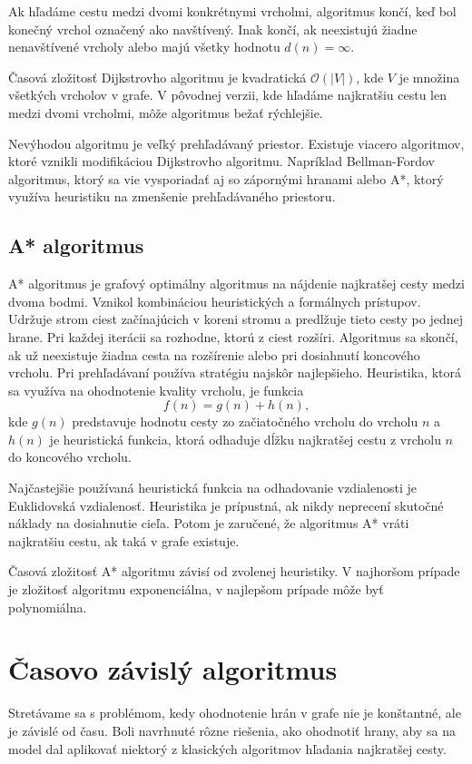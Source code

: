 Ak hľadáme cestu medzi dvomi konkrétnymi vrcholmi, algoritmus končí, keď bol konečný vrchol označený ako navštívený. Inak končí, ak neexistujú žiadne nenavštívené vrcholy alebo majú všetky hodnotu $d(n) = \infty$.

Časová zložitosť Dijkstrovho algoritmu je kvadratická
$\mathcal{O}(|V|)$, kde $V$ je množina všetkých vrcholov v grafe. V pôvodnej verzii, kde hľadáme najkratšiu cestu len medzi dvomi vrcholmi, môže algoritmus bežať rýchlejšie.

Nevýhodou algoritmu je veľký prehľadávaný priestor. Existuje viacero algoritmov, ktoré vznikli modifikáciou Dijkstrovho algoritmu. Napríklad Bellman-Fordov algoritmus, ktorý sa vie vysporiadať aj so zápornými hranami alebo A*, ktorý využíva heuristiku na zmenšenie prehľadávaného priestoru. 

\subsection{A* algoritmus}
\label{sec:a-star}
A* algoritmus je grafový optimálny algoritmus na nájdenie najkratšej cesty medzi dvoma bodmi. Vznikol kombináciou heuristických a formálnych prístupov. Udržuje strom ciest začínajúcich v koreni stromu a predlžuje tieto cesty po jednej hrane. Pri každej iterácii sa rozhodne, ktorú z ciest rozšíri. Algoritmus sa skončí, ak už neexistuje žiadna cesta na rozšírenie alebo pri dosiahnutí koncového vrcholu. Pri prehľadávaní používa stratégiu najskôr najlepšieho. Heuristika, ktorá sa využíva na ohodnotenie kvality vrcholu, je funkcia
\begin{equation}
f(n) = g(n) + h(n), 
\end{equation}
kde $g(n)$ predstavuje hodnotu cesty zo začiatočného vrcholu do vrcholu $n$ a $h(n)$ je heuristická funkcia, ktorá odhaduje dĺžku najkratšej cestu z vrcholu $n$ do koncového vrcholu.

Najčastejšie používaná heuristická funkcia na odhadovanie vzdialenosti je Euklidovská vzdialenosť.
Heuristika je prípustná, ak nikdy neprecení skutočné náklady na dosiahnutie cieľa. Potom je zaručené, že algoritmus A* vráti najkratšiu cestu, ak taká v grafe existuje.

Časová zložitosť A* algoritmu závisí od zvolenej heuristiky. V najhoršom prípade je zložitosť algoritmu exponenciálna, v najlepšom prípade môže byť polynomiálna.

\section{Časovo závislý algoritmus}
\label{sec:time-dependant-algorithm}
Stretávame sa s problémom, kedy ohodnotenie hrán v grafe nie je konštantné, ale je závislé od času. Boli navrhnuté rôzne riešenia, ako ohodnotiť hrany, aby sa na model dal aplikovať niektorý z klasických algoritmov hľadania najkratšej cesty. 

